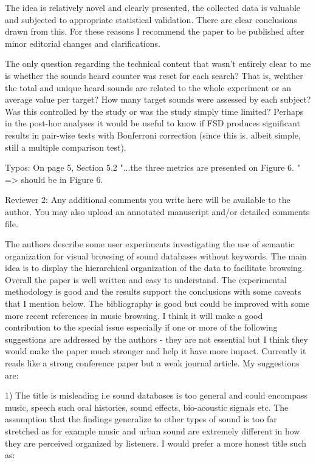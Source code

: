 \documentclass[10pt]{article}
\begin{document}
The idea is relatively novel and clearly presented, the collected data is valuable and subjected to appropriate statistical validation. There are clear conclusions drawn from this. For these reasons I recommend the paper to be published after minor editorial changes and clarifications. 

The only question regarding the technical content that wasn't entirely clear to me is whether the sounds heard counter was reset for each search? That is, wehther the total and unique heard sounds are related to the whole experiment or an average value per target? How many target sounds were assessed by each subject? Was this controlled by the study or was the study simply time limited? Perhaps in the post-hoc analyses it would be useful to know if FSD produces significant results in pair-wise tests with Bonferroni correction (since this is, albeit simple, still a multiple comparison test). 

Typos:
On page 5, Section 5.2  "...the three metrics are presented on Figure 6. " => should be in Figure 6.




Reviewer 2: Any additional comments you write here will be available to the author. You may also upload an annotated manuscript and/or detailed comments file.

The authors describe some user experiments investigating the use of semantic organization for visual browsing of sound databases without keywords. 
The main idea is to display the hierarchical organization of the data to facilitate browsing. Overall the paper is well written and easy to understand. The 
experimental methodology is good and the results support the conclusions with some caveats that I mention below. The bibliography is good but 
could be improved with some more recent references in music browsing. I think it will make a good contribution to the special issue especially 
if one or more of the following suggestions are addressed by the authors - they are not essential but I think they would make the paper 
much stronger and help it have more impact. Currently it reads like a strong conference paper but a weak journal article. 
My suggestions are: 

1) The title is misleading i.e sound databases is too general and could encompass music, speech such oral histories, sound effects, bio-acoustic signals etc. 
The assumption that the findings generalize to other types of sound is too far stretched as for example music and urban sound are extremely different 
in how they are perceived organized by listeners. I would prefer a more honest title such as: 
\end{document}
